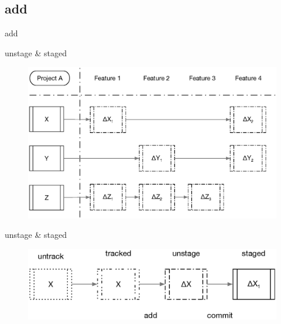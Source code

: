 \documentclass{beamer}
\begin{document}
\subsection[add]{add}
\begin{frame}{add}
\end{frame}

\begin{frame}{unstage \& staged}
    \begin{figure}
        \center
        \includegraphics[width=.9\textwidth]{project-changed-1}
        \label{fig:project-changed-1}
    \end{figure}
\end{frame}

\begin{frame}{unstage \& staged}
    \begin{figure}
        \center
        \includegraphics[width=.9\textwidth]{unstage-and-staged}
        \label{fig:unstage-and-staged}
    \end{figure}
\end{frame}
\end{document}
